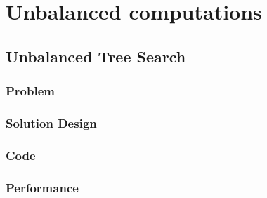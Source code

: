 \chapter{Unbalanced computations}\label{chap:Unbalanced}
\section{Unbalanced Tree Search}
\subsection{Problem}
\subsection{Solution Design}
\subsection{Code}
\subsection{Performance}